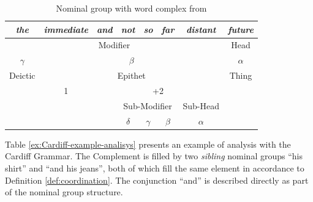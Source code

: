     \begin{table}[!ht]
        \centering
            \begin{tabular}{ccc|c|c|c|c|c}
                \hline
                \multicolumn{1}{|c|}{\textit{the}} & \multicolumn{1}{c|}{\textit{immediate}} & \textit{and}          & \textit{not} & \textit{so} & \textit{far} & \textit{distant}          & \multicolumn{1}{c|}{\textit{future}} \\ \hline
                \multicolumn{7}{|c|}{Modifier} & \multicolumn{1}{c|}{Head} \\ \hline
                \multicolumn{1}{|c|}{$\gamma$}            & \multicolumn{6}{c|}{$\beta$}                                                                                                                  & \multicolumn{1}{c|}{$\alpha$}               \\ \hline
                \multicolumn{1}{|c|}{Deictic}      & \multicolumn{6}{c|}{Epithet}                                                                                                            & \multicolumn{1}{c|}{Thing}           \\ \hline
                \multicolumn{1}{c|}{}              & \multicolumn{1}{c|}{1}                  & \multicolumn{5}{c|}{+2}                                                                       &                                      \\ \cline{2-7}
                \multicolumn{1}{l}{} & \multicolumn{1}{l}{} & \multicolumn{1}{l|}{} & \multicolumn{3}{c|}{Sub-Modifier} & Sub-Head & \multicolumn{1}{l}{} \\ \cline{4-7}
                &  &  & $\delta$ & $\gamma$ & $\beta$ & $\alpha$ &  \\ \cline{4-7}
            \end{tabular}%
        \caption{Nominal group with word complex from \citep[564]{Halliday2013}}
        \label{tab:sydney-coordination-ifg}
    \end{table}
    
    
    Table \ref{ex:Cardiff-example-analisys} presents an example of analysis with the Cardiff Grammar. The Complement is filled by two \textit{sibling} nominal groups ``his shirt'' and ``and his jeans'', both of which fill the same element in accordance to Definition \ref{def:coordination}. The conjunction ``and'' is described directly as part of the nominal group structure.
    
